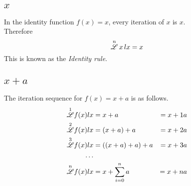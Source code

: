 \documentclass[12pt, letterpaper]{article}
\begin{document}
\subsection{$x$}
In the identity function \(f(x) = x\), every iteration of \(x\) is \(x\). 
\\
Therefore
$$\overset{n}{\mathscr{L}} \, x \, lx = x$$
This is known as the \textit{Identity rule}.

\subsection{$x+a$}
The iteration sequence for $f(x) = x+a$ is as follows.
\begin{alignat*}{3}
    \overset{1}{\mathscr{L}} f(x) lx &= x + a             &= x + 1a \\
    \overset{2}{\mathscr{L}} f(x) lx &= (x + a) + a       &= x + 2a \\
    \overset{3}{\mathscr{L}} f(x) lx &= ((x + a) + a) + a &= x + 3a \\
       \dots \\
    \overset{n}{\mathscr{L}} f(x) lx &= x + \sum_{i=0}^n a  & = x + na \\
\end{alignat*}
\end{document}
